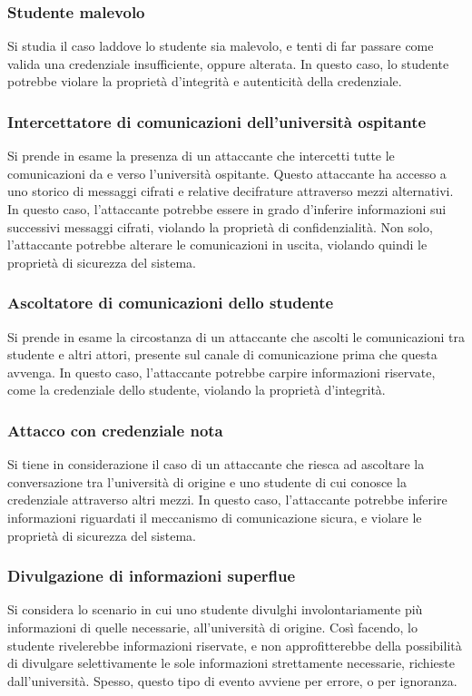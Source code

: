 \documentclass[a4paper,12pt]{article}
\begin{document}
\subsubsection{Studente malevolo}
Si studia il caso laddove lo studente sia malevolo, e tenti di far passare come valida una credenziale insufficiente, oppure alterata. In questo caso, lo studente potrebbe violare la proprietà d'integrità e autenticità della credenziale.
\subsubsection{Intercettatore di comunicazioni dell'università ospitante}
Si prende in esame la presenza di un attaccante che intercetti tutte le comunicazioni da e verso l'università ospitante. Questo attaccante ha accesso a uno storico di messaggi cifrati e relative decifrature attraverso mezzi alternativi. 
\newline In questo caso, l'attaccante potrebbe essere in grado d'inferire informazioni sui successivi messaggi cifrati, violando la proprietà di confidenzialità. Non solo, l'attaccante potrebbe alterare le comunicazioni in uscita, violando quindi le proprietà di sicurezza del sistema.
\subsubsection{Ascoltatore di comunicazioni dello studente}
Si prende in esame la circostanza di un attaccante che ascolti le comunicazioni tra studente e altri attori, presente sul canale di comunicazione prima che questa avvenga. In questo caso, l'attaccante potrebbe carpire informazioni riservate, come la credenziale dello studente, violando la proprietà d'integrità.
\subsubsection{Attacco con credenziale nota}
Si tiene in considerazione il caso di un attaccante che riesca ad ascoltare la conversazione tra l'università di origine e uno studente di cui conosce la credenziale attraverso altri mezzi.
\newline In questo caso, l'attaccante potrebbe inferire informazioni riguardati il meccanismo di comunicazione sicura, e violare le proprietà di sicurezza del sistema. 
\subsubsection{Divulgazione di informazioni superflue}
Si considera lo scenario in cui uno studente divulghi involontariamente più informazioni di quelle necessarie, all'università di origine. Così facendo, lo studente rivelerebbe informazioni riservate, e non approfitterebbe della possibilità di divulgare selettivamente le sole informazioni strettamente necessarie, richieste dall'università. Spesso, questo tipo di evento avviene per errore, o per ignoranza.
\end{document}
